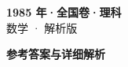 \documentclass[zihao=-4, a4paper]{ctexart}
\begin{document}
\begin{center}
  {\Large\bfseries 1985 年·全国卷·理科}\\[4pt]
  {\large 数学 · 解析版}
\end{center}
\medskip
{}

\clearpage
{}
\begin{center}{\Large\bfseries 参考答案与详细解析}\end{center}
\medskip

\end{document}
